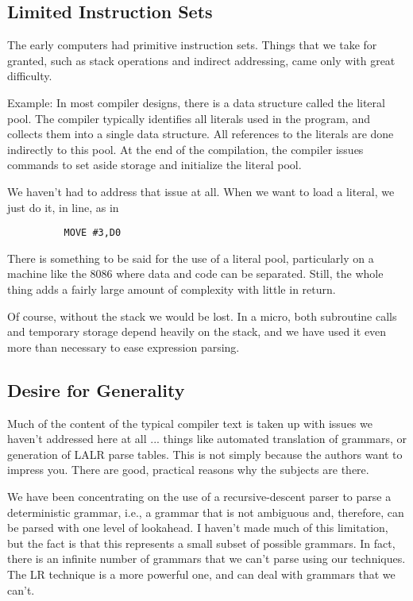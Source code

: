 \subsection{Limited Instruction Sets}

The early computers had primitive instruction sets. Things that  we  take  for granted, such as  stack  operations  and indirect addressing, came only with great difficulty.

Example: In most compiler designs, there is a data structure called the literal pool. The compiler  typically identifies all literals used in the program, and collects  them  into a single data structure. All references to the literals are done  indirectly  to  this  pool. At  the   end   of  the compilation, the  compiler  issues  commands  to  set  aside storage and initialize the literal pool.

We haven't had to address that  issue  at all. When we want to load a literal, we just do it, in line, as in

\begin{verbatim}
          MOVE #3,D0
\end{verbatim}

There is something to be said for the use of a literal pool, particularly on a machine like  the 8086 where data and code can  be separated. Still, the whole  thing  adds  a  fairly large amount of complexity with little in return.

Of course, without the stack we would be lost. In  a micro, both  subroutine calls and temporary storage depend  heavily on the stack, and  we  have used it even more than necessary to ease expression parsing.

\subsection{Desire for Generality}

Much of the content of the typical compiler text is taken up with issues we haven't addressed here at all ... things like automated  translation  of  grammars, or generation of LALR parse tables. This is not simply because  the  authors want to impress you. There are good, practical  reasons  why the subjects are there.

We have been concentrating on the use of a recursive-descent parser to parse a  deterministic  grammar, i.e., a grammar that is not ambiguous and, therefore, can be parsed with one level of lookahead. I haven't made much of this limitation, but  the  fact  is  that  this represents a small subset  of possible grammars. In fact, there is an infinite number of grammars that we can't parse using our techniques. The LR technique is a more powerful one, and can deal with grammars that we can't.

